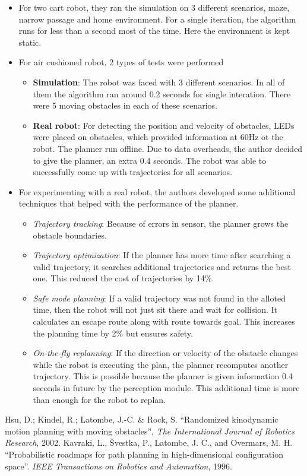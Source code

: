 \documentclass[12pt]{article}
\begin{document}
\begin{itemize}
    \item For two cart robot, they ran the simulation on 3 different scenarios, maze, narrow passage and home environment. For a single iteration, the algorithm runs for less than a second most of the time. Here the environment is kept static.
    \item For air cushioned robot, 2 types of tests were performed
        \begin{itemize}
            \item \textbf{Simulation}: The robot was faced with 3 different scenarios. In all of them the algorithm ran around 0.2 seconds for single interation. There were 5 moving obstacles in each of these scenarios.
            \item \textbf{Real robot}: For detecting the position and velocity of obstacles, LEDs were placed on obstacles, which provided information at 60Hz ot the robot. The planner run offline. Due to data overheads, the author decided to give the planner, an extra 0.4 seconds. The robot was able to successfully come up with trajectories for all scenarios.
        \end{itemize}
    \item For experimenting with a real robot, the authors developed some additional techniques that helped with the performance of the planner.
        \begin{itemize}
            \item \textit{Trajectory tracking}: Because of errors in sensor, the planner grows the obstacle boundaries.
            \item \textit{Trajectory optimization}: If the planner has more time after searching a valid trajectory, it searches additional trajectories and returns the best one. This reduced the cost of trajectories by 14\%.
            \item \textit{Safe mode planning}: If a valid trajectory was not found in the alloted time, then the robot will not just sit there and wait for collision. It calculates an escape route along with route towards goal. This increases the planning time by 2\% but ensures safety.
            \item \textit{On-the-fly replanning}: If the direction or velocity of the obstacle changes while the robot is executing the plan, the planner recomputes another trajectory. This is possible because the planner is given information 0.4 seconds in future by the perception module. This additional time is more than enough for the robot to replan.
        \end{itemize}
\end{itemize}
\begin{thebibliography}{1}
     Hsu, D.; Kindel, R.; Latombe, J.-C. \& Rock, S. ``Randomized kinodynamic motion planning with moving obstacles'', \textit{The International Journal of Robotics Research}, 2002.
     Kavraki, L., Švestka, P., Latombe, J. C., and Overmars, M. H. ``Probabilistic roadmaps for path planning in high-dimensional configuration space''. \textit{IEEE Transactions on Robotics and Automation}, 1996.
\end{thebibliography}
\end{document}
